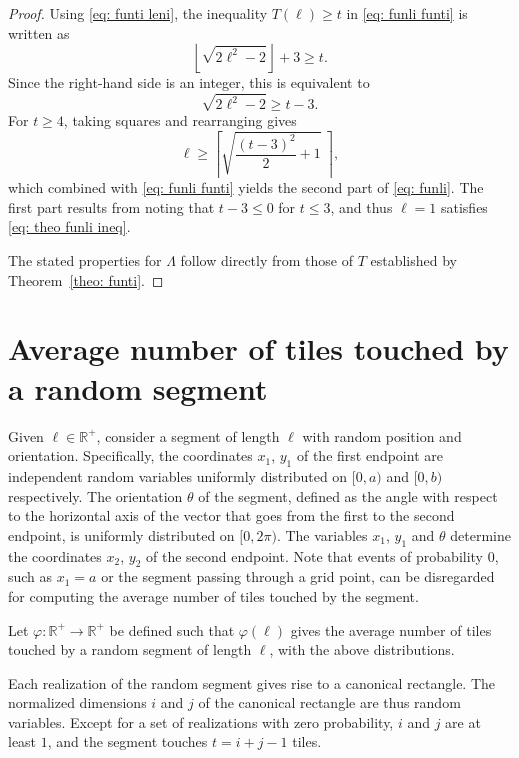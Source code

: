 \documentclass[12pt, a4paper]{article}
\newcommand{\funti}{T} %
\newcommand{\funli}{\Lambda} %
\newcommand{\funta}{\varphi} %
\newcommand{\len}{\ell} %
\newcommand{\leni}{\ell} %
\newcommand{\tiles}{t} %
\newcommand{\orient}{\theta}
\begin{document}
\begin{proof}
Using \eqref{eq: funti leni}, the inequality $\funti(\leni) \geq \tiles$ in \eqref{eq: funli funti} is written as
\begin{equation}
\left\lfloor \sqrt{2\leni^2-2} \right\rfloor + 3 \geq \tiles.
\end{equation}
Since the right-hand side is an integer, this is equivalent to
\begin{equation}
\label{eq: theo funli ineq}
\sqrt{2\leni^2-2} \geq \tiles-3.
\end{equation}
For $\tiles \geq 4$, taking squares and rearranging gives
\begin{equation}
\leni \geq \left \lceil \sqrt{\frac{(\tiles-3)^2} 2 + 1} \ \right \rceil,
\end{equation}
which combined with \eqref{eq: funli funti} yields the second part of \eqref{eq: funli}. The first part results from noting that $\tiles-3 \leq 0$ for $\tiles \leq 3$, and thus $\leni=1$ satisfies \eqref{eq: theo funli ineq}.

The stated properties for $\funli$ follow directly from those of $\funti$ established by Theorem~\ref{theo: funti}.
\end{proof}


\section{Average number of tiles touched by a random segment}
\label{part: ave}

Given $\len \in \mathbb R^+$, consider a segment of length $\len$ with random position and orientation. Specifically, the coordinates $x_1$, $y_1$ of the first endpoint are independent random variables uniformly distributed on $[0,a)$ and $[0,b)$ respectively. The orientation $\orient$ of the segment, defined as the angle with respect to the horizontal axis of the vector that goes from the first to the second endpoint, is uniformly distributed on $[0,2\pi)$. The variables $x_1$, $y_1$ and $\theta$ determine the coordinates $x_2$, $y_2$ of the second endpoint. Note that events of probability $0$, such as $x_1=a$ or the segment passing through a grid point, can be disregarded for computing the average number of tiles touched by the segment.

Let $\funta: \mathbb R^+ \to \mathbb R^+$ be defined such that $\funta(\len)$ gives the average number of tiles touched by a random segment of length $\len$, with the above distributions.

Each realization of the random segment gives rise to a canonical rectangle. The normalized dimensions $i$ and $j$ of the canonical rectangle are thus random variables. Except for a set of realizations with zero probability, $i$ and $j$ are at least $1$, and the segment touches $t = i+j-1$ tiles.
\end{document}
